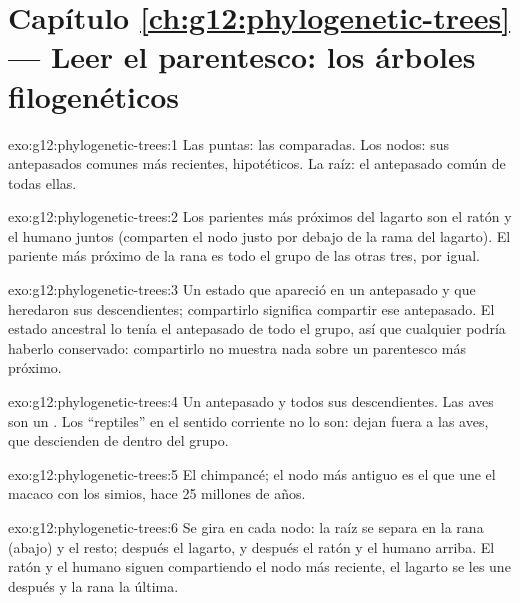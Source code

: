 \section*{Capítulo \ref{ch:g12:phylogenetic-trees} --- Leer el parentesco: los árboles filogenéticos}

\begin{solution}{exo:g12:phylogenetic-trees:1}
Las puntas: las  comparadas. Los nodos: sus antepasados
comunes más recientes, hipotéticos. La raíz: el antepasado común de
todas ellas.
\end{solution}

\begin{solution}{exo:g12:phylogenetic-trees:2}
Los parientes más próximos del lagarto son el ratón y el humano juntos
(comparten el nodo justo por debajo de la rama del lagarto). El
pariente más próximo de la rana es todo el grupo de las otras tres, por
igual.
\end{solution}

\begin{solution}{exo:g12:phylogenetic-trees:3}
Un estado que apareció en un antepasado y que heredaron sus
descendientes; compartirlo significa compartir ese antepasado. El
estado ancestral lo tenía el antepasado de todo el grupo, así que
cualquier  podría haberlo conservado: compartirlo no muestra
nada sobre un parentesco más próximo.
\end{solution}

\begin{solution}{exo:g12:phylogenetic-trees:4}
Un antepasado y todos sus descendientes. Las aves son un . Los
``reptiles'' en el sentido corriente no lo son: dejan fuera a las aves,
que descienden de dentro del grupo.
\end{solution}

\begin{solution}{exo:g12:phylogenetic-trees:5}
El chimpancé; el nodo más antiguo es el que une el macaco con los
simios, hace 25 millones de años.
\end{solution}

\begin{solution}{exo:g12:phylogenetic-trees:6}
Se gira en cada nodo: la raíz se separa en la rana (abajo) y el resto;
después el lagarto, y después el ratón y el humano arriba. El ratón y
el humano siguen compartiendo el nodo más reciente, el lagarto se les
une después y la rana la última.
\end{solution}

